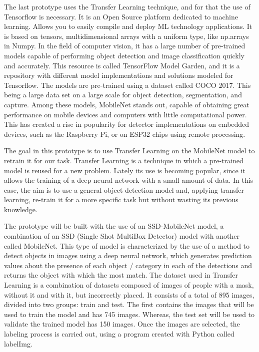 \vspace{-0.3cm}
The last prototype uses the Transfer Learning technique, and for that the use of Tensorflow is necessary. It is an Open Source platform dedicated to machine learning. Allows you to easily compile and deploy ML technology applications. It is based on tensors, multidimensional arrays with a uniform type, like np.arrays in Numpy. In the field of computer vision, it has a large number of pre-trained models capable of performing object detection and image classification quickly and accurately. This resource is called TensorFlow Model Garden, and it is a repository with different model implementations and solutions modeled for Tensorflow. The models are pre-trained using a dataset called COCO 2017. This being a large data set on a large scale for object detection, segmentation, and capture. Among these models, MobileNet stands out, capable of obtaining great performance on mobile devices and computers with little computational power. This has created a rise in popularity for detector implementations on embedded devices, such as the Raspberry Pi, or on ESP32 chips using remote processing.

\vspace{-0.3cm}
The goal in this prototype is to use Transfer Learning on the MobileNet model to retrain it for our task. Transfer Learning is a technique in which a pre-trained model is reused for a new problem. Lately its use is becoming popular, since it allows the training of a deep neural network with a small amount of data. In this case, the aim is to use a general object detection model and, applying transfer learning, re-train it for a more specific task but without wasting its previous knowledge. 

\vspace{-0.3cm}
The prototype will be built with the use of an SSD-MobileNet model, a combination of an SSD (Single Shot MultiBox Detector) model with another called MobileNet. This type of model is characterized by the use of a method to detect objects in images using a deep neural network, which generates prediction values about the presence of each object / category in each of the detections and returns the object with which the most match. The dataset used in Transfer Learning is a combination of datasets composed of images of people with a mask, without it and with it, but incorrectly placed. It consists of a total of 895 images, divided into two groups: train and test. The first contains the images that will be used to train the model and has 745 images. Whereas, the test set will be used to validate the trained model has 150 images. Once the images are selected, the labeling process is carried out, using a program created with Python called labelImg. 

